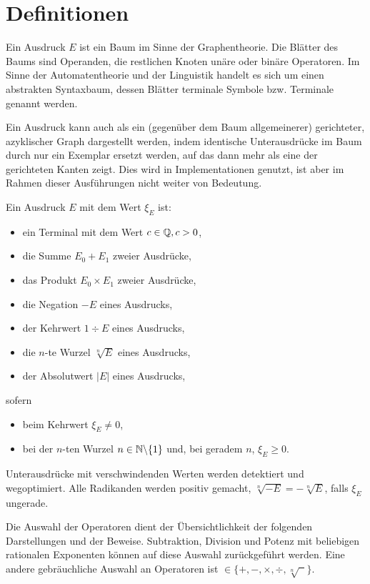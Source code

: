 %
%
\pagebreak
\section{Definitionen}

\begin{definition}
Ein Ausdruck $E$ ist ein Baum 
im Sinne der Graphentheorie.
Die Blätter des Baums sind Operanden, 
die restlichen Knoten unäre oder binäre Operatoren.
Im Sinne der Automatentheorie und der Linguistik
handelt es sich um einen abstrakten Syntaxbaum,
dessen Blätter terminale Symbole bzw. Terminale 
genannt werden.

\begin{note}
Ein Ausdruck kann auch als ein 
(gegenüber dem Baum allgemeinerer)
gerichteter, azyklischer Graph dargestellt werden,
indem identische Unterausdrücke im Baum 
durch nur ein Exemplar ersetzt werden,
auf das dann mehr als eine der gerichteten Kanten zeigt.
Dies wird in Implementationen genutzt,
ist aber im Rahmen dieser Ausführungen nicht weiter von Bedeutung.
\end{note}
\end{definition}


\pagebreak
\begin{definition}[Ausdruck]\label{de:Ausdruck}
Ein Ausdruck $E$ mit dem Wert $\xi_E$ ist:
\begin{itemize}
\item ein Terminal mit dem Wert $c\in\mathbb{Q}, c>0$,
\item die Summe $E_0+E_1$ zweier Ausdrücke,
\item das Produkt $E_0\times E_1$ zweier Ausdrücke,
\item die Negation $-E$ eines Ausdrucks,
\item der Kehrwert $1\div E$ eines Ausdrucks,
\item die $n$-te Wurzel $\sqrt[n]{E}$ eines Ausdrucks,
\item der Absolutwert $|E|$ eines Ausdrucks,
\end{itemize}
sofern
\begin{itemize}
\item beim Kehrwert $\xi_E\ne 0$,
\item bei der $n$-ten Wurzel $n\in\mathbb{N}\backslash\{1\}$ 
	        und, bei geradem $n$, $\xi_E\ge 0$.
\end{itemize}
Unterausdrücke mit verschwindenden Werten
werden detektiert und wegoptimiert.
Alle Radikanden werden positiv gemacht,
$\sqrt[n]{-E}=-\sqrt[n]{E}$, falls $\xi_E$ ungerade.
\begin{note}
Die Auswahl der Operatoren dient der Übersichtlichkeit
der folgenden Darstellungen und der Beweise.
Subtraktion, Division 
und Potenz mit beliebigen rationalen Exponenten können
auf diese Auswahl zurückgeführt werden.
Eine andere gebräuchliche Auswahl an Operatoren
ist $\in\{+, -, \times, \div, \sqrt[n]{\phantom{x}}\}$.
\end{note}
\end{definition}



